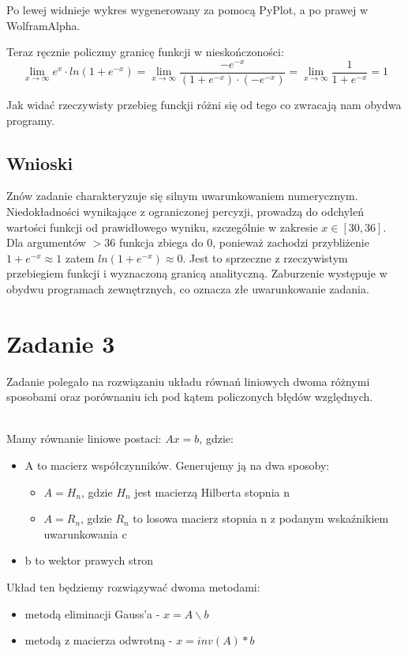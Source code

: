 \documentclass{article}
\begin{document}
\noindent Po lewej widnieje wykres wygenerowany za pomocą PyPlot, a po prawej w WolframAlpha.

\noindent Teraz ręcznie policzmy granicę funkcji w nieskończoności:
\[
 \lim_{x \to \infty } e^x \cdot ln(1 + e^{-x}) = \lim_{x \to \infty} \frac {-e^{-x}}{(1 + e^{-x}) \cdot (-e ^{-x})} = \lim_{x \to \infty} \frac{1}{1 + e^{-x}} = 1
\]

\noindent Jak widać rzeczywisty przebieg funckji różni się od tego co zwracają nam obydwa programy.
\subsection*{Wnioski} 
Znów zadanie charakteryzuje się silnym uwarunkowaniem numerycznym. Niedokładności wynikające z ograniczonej percyzji, prowadzą do odchyleń wartości funkcji od prawidłowego wyniku, szczególnie w zakresie $x \in [30, 36]$. Dla argumentów $>36$ funkcja zbiega do 0, ponieważ zachodzi przybliżenie $ 1 + e^{-x} \approx 1$ zatem $ln(1 + e^{-x}) \approx 0$. Jest to sprzeczne z rzeczywistym przebiegiem funkcji i wyznaczoną granicą analityczną. Zaburzenie występuje w obydwu programach zewnętrznych, co oznacza złe uwarunkowanie zadania.

\section{Zadanie 3}
Zadanie polegało na rozwiązaniu układu równań liniowych dwoma różnymi sposobami oraz porównaniu ich pod kątem policzonych błędów względnych.


\noindent \\ Mamy równanie liniowe postaci: $Ax = b$, gdzie: \\
\begin{itemize}
\item A to macierz współczynników. Generujemy ją na dwa sposoby:\\
    \begin{itemize}
        \item $A = H_n$, gdzie $H_n$ jest macierzą Hilberta stopnia n 
        \item $A = R_n$, gdzie $R_n$ to losowa macierz stopnia n z podanym wskaźnikiem uwarunkowania c
    \end{itemize}
\item b to wektor prawych stron
\end{itemize}

\noindent Układ ten będziemy rozwiązywać dwoma metodami:
\begin{itemize}
    \item metodą eliminacji Gauss'a - $x = A \backslash b$
    \item metodą z macierza odwrotną - $x = inv(A) * b$
\end{itemize}
\end{document}
